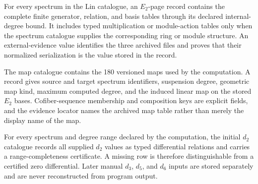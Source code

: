\begin{definition}
  \label{def:lin-e2-page-catalogue}
  \notready
  For every spectrum in the Lin catalogue, an $E_2$-page record contains the
  complete finite generator, relation, and basis tables through its declared
  internal-degree bound.  It includes typed multiplication or module-action
  tables only when the spectrum catalogue supplies the corresponding ring or
  module structure.  An external-evidence value identifies the three archived
  files and proves that their normalized serialization is the value stored in
  the record.
\end{definition}

\begin{definition}
  \label{def:lin-map-catalogue}
  \notready
  The map catalogue contains the 180 versioned maps used by the computation.
  A record gives source and target spectrum identifiers, suspension degree,
  geometric map kind, maximum computed degree, and the induced linear map on
  the stored $E_2$ bases.  Cofiber-sequence membership and composition keys are
  explicit fields, and the evidence locator names the archived map table rather
  than merely the display name of the map.
\end{definition}

\begin{definition}
  \label{def:lin-d2-catalogue}
  \notready
  For every spectrum and degree range declared by the computation, the initial
  $d_2$ catalogue records all supplied $d_2$ values as typed differential
  relations and carries a range-completeness certificate.  A missing row is
  therefore distinguishable from a certified zero differential.  Later manual
  $d_3$, $d_5$, and $d_6$ inputs are stored separately and are never
  reconstructed from program output.
\end{definition}

